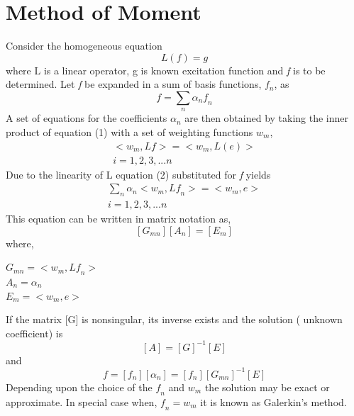 \documentclass[aps,prstab,twocolumn,superscriptaddress,groupedaddress,showkeys,nofootinbib]{revtex4}  %
\begin{document}
\section{Method of Moment}
Consider the homogeneous equation\cite{harri}
\begin{equation}
L\left ( \mathit{f} \right )=g
\end{equation}
where L is a linear operator, g is known excitation function and \textit{f} is to be determined. Let \textit{f} be expanded in a sum of basis functions, $f_{n}$, as
\begin{equation}
\mathit{f}=\sum_{n}\alpha_{n} \mathit{f}_{n}
\end{equation}
A set of equations for the coefficients $\alpha_{n}$ are then obtained by taking the inner product of equation (1) with a set of weighting functions {$w_{m}$},
\begin{eqnarray}
<w_{m},L\mathit{f}>= <w_{m},L(\mathit{e})> \\ \nonumber
i=1,2,3,...n
\end{eqnarray}
Due to the linearity of L equation (2) substituted for \textit{f} yields
\begin{eqnarray}
\sum_{n}\alpha_{n}<w_{m},L\mathit{f_{n}}>= <w_{m},\mathit{e}> \\ \nonumber
i=1,2,3,...n
\end{eqnarray}
This equation can be written in matrix notation as,
\begin{equation}
\left [ G_{mn} \right ]\left [A_{n}  \right ]=\left [ E_{m} \right ]
\end{equation}
where,\\
\begin{center}
$G_{mn}=<w_{m},L\textit{f}_{n}>$\\
$A_{n}=\alpha_{n}$ \\
$E_{m}=<w_{m},\textit{e}>$\\
\end{center}
If the matrix [G] is nonsingular, its inverse exists and the solution ( unknown coefficient) is 
\begin{equation}
\left [ A \right ]=\left [G  \right ]^{-1}\left [ E \right ]
\end{equation}
and 
\begin{equation}
\mathit{f}=[f_{n}][\alpha_n]=[f_{n}][G_{mn}]^{-1}[E]
\end{equation}
Depending upon the choice of the $\textit{f}_{n}$ and  $w_{m}$ the solution may be exact or approximate. In special case when, $\textit{f}_{n}= w_{m}$  it is known as Galerkin's method.
\end{document}
